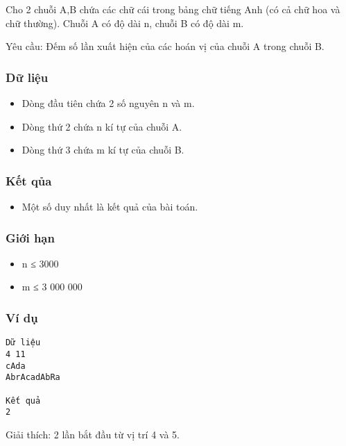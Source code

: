



   Cho 2 chuỗi A,B chứa các chữ cái trong bảng chữ tiếng Anh (có cả chữ hoa và chữ thường). Chuỗi A có độ dài n, chuỗi B có độ dài m.  

       Yêu cầu:      Đếm số lần xuất hiện của các hoán vị của chuỗi A trong chuỗi B.  

\subsubsection{   Dữ liệu  }
\begin{itemize}
	\item     Dòng đầu tiên chứa 2 số nguyên n và m.   
	\item     Dòng thứ 2 chứa n kí tự của chuỗi A.   
	\item     Dòng thứ 3 chứa m kí tự của chuỗi B.   
\end{itemize}

\subsubsection{   Kết qủa  }
\begin{itemize}
	\item     Một số duy nhất là kết quả của bài toán.   
\end{itemize}

\subsubsection{   Giới hạn  }
\begin{itemize}
	\item     n ≤ 3000   
	\item     m ≤ 3 000 000   
\end{itemize}

\subsubsection{   Ví dụ  }
\begin{verbatim}
Dữ liệu
4 11
cAda
AbrAcadAbRa

Kết quả
2
\end{verbatim}

       Giải thích:      2 lần bắt đầu từ vị trí 4 và 5.  